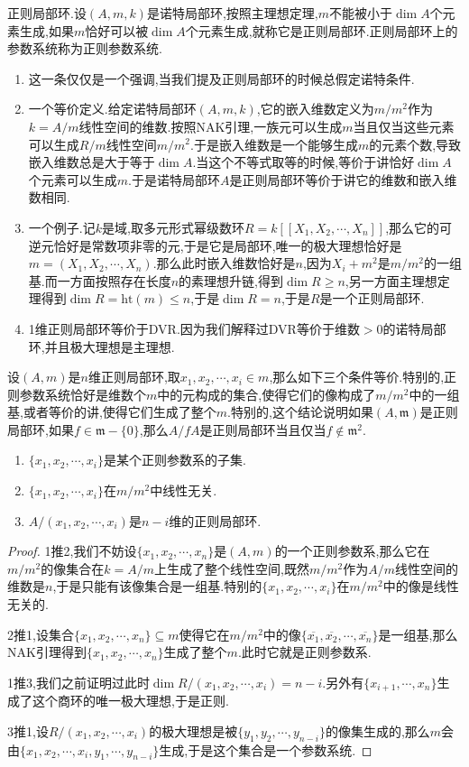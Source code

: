 正则局部环.设$(A,m,k)$是诺特局部环,按照主理想定理,$m$不能被小于$\dim A$个元素生成,如果$m$恰好可以被$\dim A$个元素生成,就称它是正则局部环.正则局部环上的参数系统称为正则参数系统.
\begin{enumerate}
	\item 这一条仅仅是一个强调,当我们提及正则局部环的时候总假定诺特条件.
	\item 一个等价定义.给定诺特局部环$(A,m,k)$,它的嵌入维数定义为$m/m^2$作为$k=A/m$线性空间的维数.按照NAK引理,一族元可以生成$m$当且仅当这些元素可以生成$R/m$线性空间$m/m^2$.于是嵌入维数是一个能够生成$m$的元素个数,导致嵌入维数总是大于等于$\dim A$.当这个不等式取等的时候,等价于讲恰好$\dim A$个元素可以生成$m$.于是诺特局部环$A$是正则局部环等价于讲它的维数和嵌入维数相同.
	\item 一个例子.记$k$是域,取多元形式幂级数环$R=k[[X_1,X_2,\cdots,X_n]]$,那么它的可逆元恰好是常数项非零的元,于是它是局部环,唯一的极大理想恰好是$m=(X_1,X_2,\cdots,X_n)$.那么此时嵌入维数恰好是$n$,因为$X_i+m^2$是$m/m^2$的一组基.而一方面按照存在长度$n$的素理想升链,得到$\dim R\ge n$,另一方面主理想定理得到$\dim R=\mathrm{ht}(m)\le n$,于是$\dim R=n$,于是$R$是一个正则局部环.
	\item 1维正则局部环等价于DVR.因为我们解释过DVR等价于维数$>0$的诺特局部环,并且极大理想是主理想.
\end{enumerate}

设$(A,m)$是$n$维正则局部环,取$x_1,x_2,\cdots,x_i\in m$,那么如下三个条件等价.特别的,正则参数系统恰好是维数个$m$中的元构成的集合,使得它们的像构成了$m/m^2$中的一组基,或者等价的讲,使得它们生成了整个$m$.特别的,这个结论说明如果$(A,\mathfrak{m})$是正则局部环,如果$f\in\mathfrak{m}-\{0\}$,那么$A/fA$是正则局部环当且仅当$f\not\in\mathfrak{m}^2$.
\begin{enumerate}
	\item $\{x_1,x_2,\cdots,x_i\}$是某个正则参数系的子集.
	\item $\{x_1,x_2,\cdots,x_i\}$在$m/m^2$中线性无关.
	\item $A/(x_1,x_2,\cdots,x_i)$是$n-i$维的正则局部环.
\end{enumerate}
\begin{proof}
	
	1推2,我们不妨设$\{x_1,x_2,\cdots,x_n\}$是$(A,m)$的一个正则参数系,那么它在$m/m^2$的像集合在$k=A/m$上生成了整个线性空间,既然$m/m^2$作为$A/m$线性空间的维数是$n$,于是只能有该像集合是一组基.特别的$\{x_1,x_2,\cdots,x_i\}$在$m/m^2$中的像是线性无关的.
	
	2推1,设集合$\{x_1,x_2,\cdots,x_n\}\subseteq m$使得它在$m/m^2$中的像$\{\overline{x_1},\overline{x_2},\cdots,\overline{x_n}\}$是一组基,那么NAK引理得到$\{x_1,x_2,\cdots,x_n\}$生成了整个$m$.此时它就是正则参数系.
	
	1推3,我们之前证明过此时$\dim R/(x_1,x_2,\cdots,x_i)=n-i$.另外有$\{x_{i+1},\cdots,x_n\}$生成了这个商环的唯一极大理想,于是正则.
	
	3推1,设$R/(x_1,x_2,\cdots,x_i)$的极大理想是被$\{y_1,y_2,\cdots,y_{n-i}\}$的像集生成的,那么$m$会由$\{x_1,x_2,\cdots,x_i,y_1,\cdots,y_{n-i}\}$生成,于是这个集合是一个参数系统.
\end{proof}

